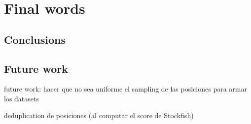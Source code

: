\section{Final words}
\subsection{Conclusions}
\subsection{Future work}




future work: hacer que no sea uniforme el sampling de las posiciones para armar los datasets

deduplication de posiciones (al computar el score de Stockfish)